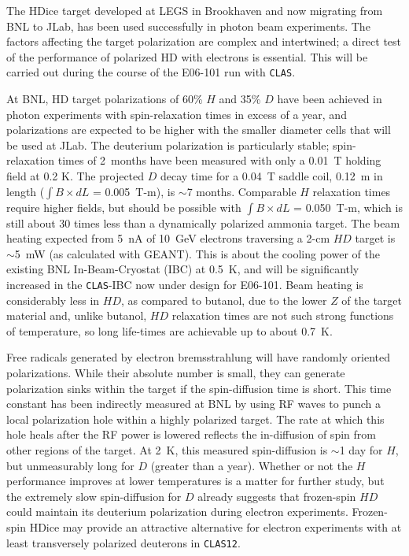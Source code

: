 The HDice target developed at LEGS in Brookhaven and now migrating from BNL 
to JLab, has been used successfully in photon beam experiments.  The factors 
affecting the target polarization are complex and intertwined; a direct test 
of the performance of polarized HD with electrons is essential.  This will 
be carried out during the course of the E06-101 run with {\tt CLAS}.

At BNL, HD target polarizations of 60\% $H$ and 35\% $D$ have been achieved 
in photon experiments with spin-relaxation times in excess of a year, and 
polarizations are expected to be higher with the smaller diameter cells 
that will be used at JLab. The deuterium polarization is particularly stable; 
spin-relaxation times of 2~months have been measured with only a 0.01~T 
holding field at 0.2 K. The projected $D$ decay time for a 0.04~T saddle coil,
0.12~m in length ($\int B \times  dL$ = 0.005~T-m), is $\sim$7 months.  
Comparable $H$ relaxation times require higher fields, but should be possible 
with $\int B \times dL$ = 0.050~T-m, which is still about 30 times less than 
a dynamically polarized ammonia target.  The beam heating expected from 5~nA 
of 10~GeV electrons traversing a 2-cm $HD$ target is $\sim$5~mW (as calculated 
with GEANT).  This is about the cooling power of the existing BNL 
In-Beam-Cryostat (IBC) at 0.5~K, and will be significantly increased in the 
{\tt CLAS}-IBC now under design for E06-101.  Beam heating is considerably 
less in $HD$, as compared to butanol, due to the lower $Z$ of the target 
material and, unlike butanol, $HD$ relaxation times are not such strong 
functions of temperature, so long life-times are achievable up to about 0.7~K.

Free radicals generated by electron bremsstrahlung will have randomly 
oriented polarizations.   While their absolute number is small, they can 
generate polarization sinks within the target if the spin-diffusion time is 
short. This time constant has been indirectly measured at BNL by using RF 
waves to punch a local polarization hole within a highly polarized target.  
The rate at which this hole heals after the RF power is lowered reflects the 
in-diffusion of spin from other regions of the target. At 2~K, this measured 
spin-diffusion is $\sim$1 day for $H$, but unmeasurably long for $D$ (greater 
than a year).  Whether or not the $H$ performance improves at lower 
temperatures is a matter for further study, but the extremely slow 
spin-diffusion for $D$ already suggests that frozen-spin $HD$ could maintain 
its deuterium polarization during electron experiments.  Frozen-spin HDice 
may provide an attractive alternative for electron experiments with at least 
transversely polarized deuterons in {\tt CLAS12}.

